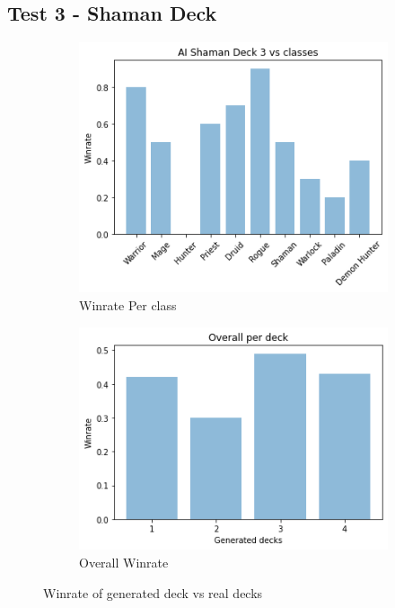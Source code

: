 \documentclass{report} %
\begin{document}
\subsection{Test 3 - Shaman Deck}
\begin{figure}[H]
\centering
\begin{subfigure}{.5\textwidth}
  \centering
  \includegraphics[width=1\linewidth]{TestImages/ShamanDeckWinrateClasses}
  \caption{Winrate Per class}
\end{subfigure}%
\begin{subfigure}{.5\textwidth}
  \centering
  \includegraphics[width=1\linewidth]{TestImages/ShamanAllGeneratedDeckOverallWinrate}
  \caption{Overall Winrate}
\end{subfigure}
\caption{Winrate of generated deck vs real decks}
\end{figure}
\end{document}
